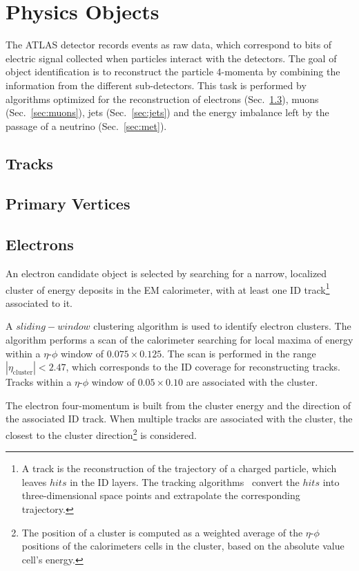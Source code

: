 \chapter{Physics Objects}
\label{sec:objects}

The ATLAS detector records events as raw data, 
which correspond to bits of electric signal collected 
when particles interact with the detectors. 
The goal of object identification is to reconstruct the particle 4-momenta
by combining the information from the different sub-detectors.
This task is performed by algorithms optimized for the reconstruction of
electrons (Sec.~\ref{sec:electrons}), muons (Sec.~\ref{sec:muons}), 
jets (Sec.~\ref{sec:jets}) and the energy imbalance left
by the passage of a neutrino (Sec.~\ref{sec:met}).

\section{Tracks}
\label{sec:tracks}

\section{Primary Vertices}
\label{sec:pv}

\section{Electrons}
\label{sec:electrons}

An electron candidate object is selected by searching for a narrow, 
localized cluster of energy deposits in the EM calorimeter, 
with at least one ID track\footnote{A track is the reconstruction of the trajectory of a charged particle, which leaves $hits$ in the ID layers. The tracking algorithms~\cite{trackalgos} convert the $hits$ into three-dimensional space points and extrapolate the corresponding trajectory.}
associated to it.

A $sliding-window$ clustering algorithm is used to identify electron clusters.
The algorithm performs a scan of the calorimeter searching for local maxima of energy
within a $\eta$-$\phi$ window of $0.075\times{}0.125$.
The scan is performed in the range $|\eta_{\mathrm{cluster}}|<2.47$, 
which corresponds to the ID coverage for reconstructing tracks. 
Tracks within a $\eta$-$\phi$ window of $0.05\times{}0.10$ are 
associated with the cluster.

The electron four-momentum is built from the cluster energy
and the direction of the associated ID track.
When multiple tracks are associated with the cluster, the closest
to the cluster direction\footnote{The position of a cluster 
is computed as a weighted average of the $\eta$-$\phi$ positions 
of the calorimeters cells in the cluster, based on the absolute value cell's energy.} 
is considered.                        

